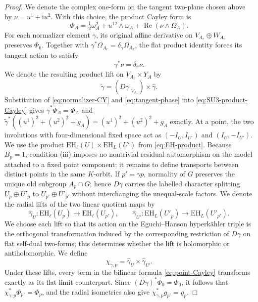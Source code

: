\documentclass[11pt]{article}
\theoremstyle{remark}\newtheorem{remark}[theorem]{Remark}
\newcommand{\ii}{\mathrm i}
\newcommand{\EH}{\mathrm{EH}}
\begin{document}
\begin{proof}
We denote the complex one-form on the tangent two-plane chosen above by
$\nu=u^1+\ii u^2$.  With this choice, the product Cayley form is
\begin{equation}\label{eq:SU3-product-Cayley}
\Phi_A=\tfrac12\omega_A^2+u^{12}\wedge\omega_A
       +\operatorname{Re}(\nu\wedge\Omega_A).
\end{equation}
For each normalizer element $\gamma$, its original affine derivative on
$V_{A_r}\oplus W_{A_r}$ preserves $\Phi_0$.  Together with
$\gamma^*\Omega_{A_r}=\delta_\gamma\Omega_{A_r}$, the flat product identity
forces its tangent action to satisfy
\begin{equation}\label{eq:tangent-phase}
\gamma^*\nu=\delta_\gamma\nu.
\end{equation}
We denote the resulting product lift on $V_{A_r}\times Y_A$ by
\[
 \widetilde\gamma
 =(D\gamma|_{V_{A_r}})\times\widehat\gamma.
\]
Substitution of \eqref{eq:normalizer-CY} and
\eqref{eq:tangent-phase} into \eqref{eq:SU3-product-Cayley} gives
$\widetilde\gamma^*\Phi_A=\Phi_A$ and
$\widetilde\gamma^*((u^1)^2+(u^2)^2+g_A)
=(u^1)^2+(u^2)^2+g_A$ exactly.
At a point, the two involutions with four-dimensional fixed space act as
$(-I_U,I_{U'})$ and $(I_U,-I_{U'})$.  We use the product
$\EH_\ell(U)\times\EH_L(U')$ from \eqref{eq:EH-product}.  Because $B_p=1$,
condition (iii) imposes no nontrivial residual automorphism on the model
attached to a fixed point component; it remains to define transports
between distinct points in the same $K$-orbit.  If
$p'=\gamma p$, normality of $G$ preserves the unique old subgroup
$A_p\cap G$; hence $D\gamma$ carries the labelled character splitting
$U_p\oplus U'_p$ to $U_{p'}\oplus U'_{p'}$ without interchanging the
unequal-scale factors.  We denote the radial lifts of the two linear
quotient maps by
\[
 \widehat{\gamma}_U:\EH_\ell(U_p)\longrightarrow\EH_\ell(U_{p'}),
 \qquad
 \widehat{\gamma}_{U'}:\EH_L(U'_p)\longrightarrow\EH_L(U'_{p'}).
\]
We choose each lift
so that its action on the Eguchi--Hanson hyperk\"ahler triple is the
orthogonal transformation induced by the corresponding restriction of
$D\gamma$ on flat self-dual two-forms; this determines whether the lift is
holomorphic or antiholomorphic.  We define
\begin{equation}\label{eq:point-transport}
 \chi_{\gamma,p}=\widehat{\gamma}_U\times\widehat{\gamma}_{U'}.
\end{equation}
Under these lifts, every term in the bilinear formula
\eqref{eq:point-Cayley} transforms exactly as its flat-limit counterpart.
Since $(D\gamma)^*\Phi_0=\Phi_0$, it follows that
$\chi_{\gamma,p}^*\Phi_{p'}=\Phi_p$, and the radial isometries also give
$\chi_{\gamma,p}^*g_{p'}=g_p$.


\end{proof}
\end{document}
